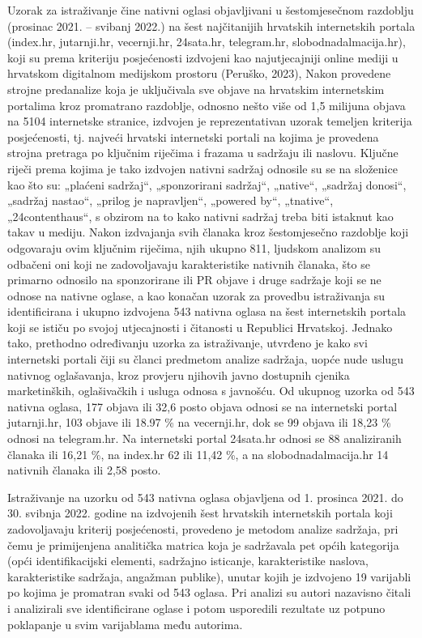 \documentclass[preprint, 3p,
authoryear]{elsarticle} %
\begin{document}
Uzorak za istraživanje čine nativni oglasi objavljivani u šestomjesečnom
razdoblju (prosinac 2021. -- svibanj 2022.) na šest najčitanijih
hrvatskih internetskih portala (index.hr, jutarnji.hr, vecernji.hr,
24sata.hr, telegram.hr, slobodnadalmacija.hr), koji su prema kriteriju
posjećenosti izdvojeni kao najutjecajniji online mediji u hrvatskom
digitalnom medijskom prostoru (Peruško, 2023), Nakon provedene strojne
predanalize koja je uključivala sve objave na hrvatskim internetskim
portalima kroz promatrano razdoblje, odnosno nešto više od 1,5 milijuna
objava na 5104 internetske stranice, izdvojen je reprezentativan uzorak
temeljen kriterija posjećenosti, tj. najveći hrvatski internetski
portali na kojima je provedena strojna pretraga po ključnim riječima i
frazama u sadržaju ili naslovu. Ključne riječi prema kojima je tako
izdvojen nativni sadržaj odnosile su se na složenice kao što su:
„plaćeni sadržaj``, „sponzorirani sadržaj``, „native``, „sadržaj
donosi``, „sadržaj nastao``, „prilog je napravljen``, „powered by``,
„tnative``, „24contenthaus``, s obzirom na to kako nativni sadržaj treba
biti istaknut kao takav u mediju. Nakon izdvajanja svih članaka kroz
šestomjesečno razdoblje koji odgovaraju ovim ključnim riječima, njih
ukupno 811, ljudskom analizom su odbačeni oni koji ne zadovoljavaju
karakteristike nativnih članaka, što se primarno odnosilo na
sponzorirane ili PR objave i druge sadržaje koji se ne odnose na nativne
oglase, a kao konačan uzorak za provedbu istraživanja su identificirana
i ukupno izdvojena 543 nativna oglasa na šest internetskih portala koji
se ističu po svojoj utjecajnosti i čitanosti u Republici Hrvatskoj.
Jednako tako, prethodno određivanju uzorka za istraživanje, utvrđeno je
kako svi internetski portali čiji su članci predmetom analize sadržaja,
uopće nude uslugu nativnog oglašavanja, kroz provjeru njihovih javno
dostupnih cjenika marketinških, oglašivačkih i usluga odnosa s javnošću.
Od ukupnog uzorka od 543 nativna oglasa, 177 objava ili 32,6 posto
objava odnosi se na internetski portal jutarnji.hr, 103 objave ili 18.97
\% na vecernji.hr, dok se 99 objava ili 18,23 \% odnosi na telegram.hr.
Na internetski portal 24sata.hr odnosi se 88 analiziranih članaka ili
16,21 \%, na index.hr 62 ili 11,42 \%, a na slobodnadalmacija.hr 14
nativnih članaka ili 2,58 posto.

Istraživanje na uzorku od 543 nativna oglasa objavljena od 1. prosinca
2021. do 30. svibnja 2022. godine na izdvojenih šest hrvatskih
internetskih portala koji zadovoljavaju kriterij posjećenosti, provedeno
je metodom analize sadržaja, pri čemu je primijenjena analitička matrica
koja je sadržavala pet općih kategorija (opći identifikacijski elementi,
sadržajno isticanje, karakteristike naslova, karakteristike sadržaja,
angažman publike), unutar kojih je izdvojeno 19 varijabli po kojima je
promatran svaki od 543 oglasa. Pri analizi su autori nazavisno čitali i
analizirali sve identificirane oglase i potom usporedili rezultate uz
potpuno poklapanje u svim varijablama među autorima.
\end{document}

